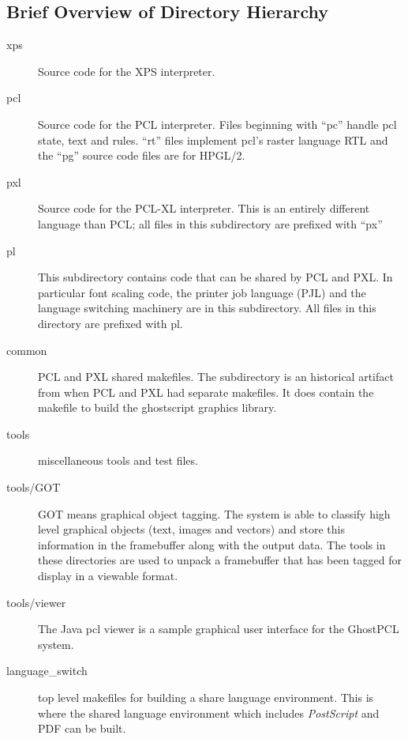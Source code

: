 \documentclass[10pt]{article}
\begin{document}
\subsection*{Brief Overview of Directory Hierarchy}
\begin{description}

\item[xps] Source code for the XPS interpreter.  

\item[pcl] Source code for the PCL interpreter.  Files beginning with
  ``pc'' handle pcl state, text and rules.  ``rt'' files implement pcl's
  raster language RTL and the ``pg'' source code files are for HPGL/2.
  
\item[pxl] Source code for the PCL-XL interpreter.  This is an
  entirely different language than PCL; all files in this subdirectory
  are prefixed with ``px''
  
\item[pl] This subdirectory contains code that can be shared by PCL
  and PXL\@.  In particular font scaling code, the printer job language
  (PJL) and the language switching machinery are in this subdirectory.
  All files in this directory are prefixed with pl.
  
\item[common] PCL and PXL shared makefiles.  The subdirectory is an
  historical artifact from when PCL and PXL had separate makefiles.
  It does contain the makefile to build the ghostscript graphics
  library.

\item[tools] miscellaneous tools and test files.
  
\item[tools/GOT] GOT means graphical object tagging.  The system is
  able to classify high level graphical objects (text, images and
  vectors) and store this information in the framebuffer along with
  the output data.  The tools in these directories are used to unpack
  a framebuffer that has been tagged for display in a viewable format.
  
\item[tools/viewer] The Java pcl viewer is a sample graphical user
  interface for the GhostPCL system.
  
\item[language\_switch] top level makefiles for building a share
  language environment.  This is where the shared language environment
  which includes \emph{PostScript} and PDF can be built.
  

\end{description}
\end{document}
